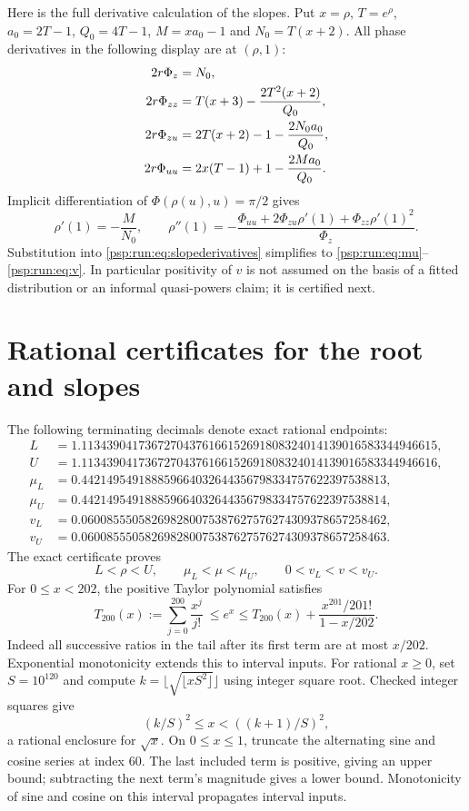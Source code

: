 \documentclass[11pt,letterpaper]{article}
\numberwithin{equation}{section}
\theoremstyle{remark}\newtheorem{remark}[theorem]{Remark}
\begin{document}
Here is the full derivative calculation of the slopes. Put $x=\rho$,
$T=e^\rho$, $a_0=2T-1$, $Q_0=4T-1$, $M=xa_0-1$ and $N_0=T(x+2)$.
All phase derivatives in the following display are at $(\rho,1)$:
\begin{align}
 2r\Phi_z&=N_0,\notag\\
 2r\Phi_{zz}&=T(x+3)-\frac{2T^2(x+2)}{Q_0},\notag\\
 2r\Phi_{zu}&=2T(x+2)-1-\frac{2N_0a_0}{Q_0},\notag\\
 2r\Phi_{uu}&=2x(T-1)+1-\frac{2Ma_0}{Q_0}.\label{psp:run:eq:phase2}
\end{align}
Implicit differentiation of $\Phi(\rho(u),u)=\pi/2$ gives
\[
 \rho'(1)=-\frac M{N_0},\qquad
 \rho''(1)=-\frac{\Phi_{uu}+2\Phi_{zu}\rho'(1)+
                         \Phi_{zz}\rho'(1)^2}{\Phi_z}.
\]
Substitution into \eqref{psp:run:eq:slopederivatives} simplifies to
\eqref{psp:run:eq:mu}--\eqref{psp:run:eq:v}. In particular positivity of $v$ is not
assumed on the basis of a fitted distribution or an informal
quasi-powers claim; it is certified next.

\section{Rational certificates for the root and slopes}\label{psp:run:sec:certificate}
The following terminating decimals denote exact rational endpoints:
\begin{align*}
 L&=1.11343904173672704376166152691808324014139016583344946615,\\
 U&=1.11343904173672704376166152691808324014139016583344946616,\\
 \mu_L&=0.442149549188859664032644356798334757622397538813,\\
 \mu_U&=0.442149549188859664032644356798334757622397538814,\\
 v_L&=0.060085550582698280075387627576274309378657258462,\\
 v_U&=0.060085550582698280075387627576274309378657258463.
\end{align*}
The exact certificate proves
\begin{equation}\label{psp:run:eq:certified}
 L<\rho<U,\qquad \mu_L<\mu<\mu_U,\qquad 0<v_L<v<v_U.
\end{equation}
For $0\leq x<202$, the positive Taylor polynomial satisfies
\begin{equation}\label{psp:run:eq:expbounds}
 T_{200}(x):=\sum_{j=0}^{200}\frac{x^j}{j!}
 \ \leq e^x\leq T_{200}(x)+\frac{x^{201}/201!}{1-x/202}.
\end{equation}
Indeed all successive ratios in the tail after its first term are at
most $x/202$. Exponential monotonicity extends this to interval inputs.
For rational $x\geq0$, set $S=10^{120}$ and compute
$k=\lfloor\sqrt{\lfloor xS^2\rfloor}\rfloor$ using integer square root.
Checked integer squares give
\[
 (k/S)^2\leq x<((k+1)/S)^2,
\]
a rational enclosure for $\sqrt x$. On $0\leq x\leq1$, truncate the
alternating sine and cosine series at index $60$. The last included
term is positive, giving an upper bound; subtracting the next term's
magnitude gives a lower bound. Monotonicity of sine and cosine on this
interval propagates interval inputs.
\end{document}
